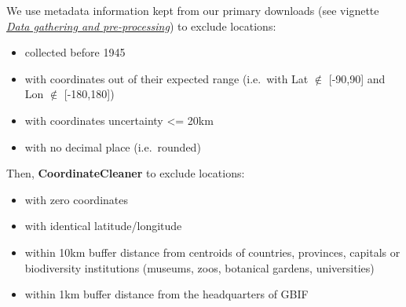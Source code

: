 \documentclass[
]{article}
\providecommand{\tightlist}{%
  \setlength{\itemsep}{0pt}\setlength{\parskip}{0pt}}
\begin{document}
We use metadata information kept from our primary downloads (see
vignette \emph{\underline{Data gathering and pre-processing}}) to
exclude locations:

\begin{itemize}
\tightlist
\item
  collected before 1945
\item
  with coordinates out of their expected range (i.e.~with Lat \(\notin\)
  {[}-90,90{]} and Lon \(\notin\) {[}-180,180{]})
\item
  with coordinates uncertainty \textless= 20km
\item
  with no decimal place (i.e.~rounded)
\end{itemize}

Then, \textbf{CoordinateCleaner} to exclude locations:

\begin{itemize}
\tightlist
\item
  with zero coordinates
\item
  with identical latitude/longitude
\item
  within 10km buffer distance from centroids of countries, provinces,
  capitals or biodiversity institutions (museums, zoos, botanical
  gardens, universities)
\item
  within 1km buffer distance from the headquarters of GBIF
\end{itemize}
\end{document}
